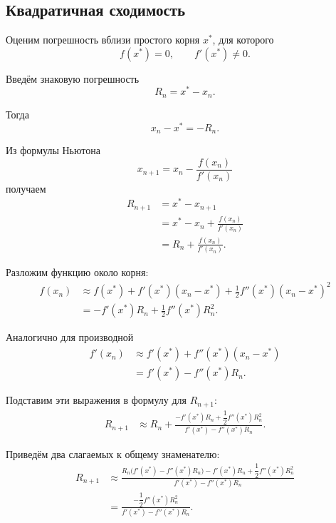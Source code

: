 \documentclass[../final.tex]{subfiles}
\begin{document}
\subsection{Квадратичная сходимость}

Оценим погрешность вблизи простого корня $x^*$, для которого
%
\begin{equation*}
    f(x^*)=0,
    \qquad
    f'(x^*)\neq0.
\end{equation*}

Введём знаковую погрешность
%
\begin{equation*}
    R_n=x^*-x_n.
\end{equation*}

Тогда
%
\begin{equation*}
    x_n-x^*=-R_n.
\end{equation*}

Из формулы Ньютона
%
\begin{equation*}
    x_{n+1}
    =
    x_n
    -
    \frac{f(x_n)}{f'(x_n)}
\end{equation*}
%
получаем
%
\begin{align*}
    R_{n+1}
    &=
    x^*-x_{n+1}
    \\
    &=
    x^*-x_n
    +
    \frac{f(x_n)}{f'(x_n)}
    \\
    &=
    R_n
    +
    \frac{f(x_n)}{f'(x_n)}.
\end{align*}

Разложим функцию около корня:
%
\begin{align*}
    f(x_n)
    &\approx
    f(x^*)
    +
    f'(x^*)(x_n-x^*)
    +
    \frac12 f''(x^*)(x_n-x^*)^2
    \\
    &=
    -f'(x^*)R_n
    +
    \frac12 f''(x^*)R_n^2.
\end{align*}

Аналогично для производной
%
\begin{align*}
    f'(x_n)
    &\approx
    f'(x^*)
    +
    f''(x^*)(x_n-x^*)
    \\
    &=
    f'(x^*)
    -
    f''(x^*)R_n.
\end{align*}

Подставим эти выражения в формулу для $R_{n+1}$:
%
\begin{align*}
    R_{n+1}
    &\approx
    R_n
    +
    \frac{
        -f'(x^*)R_n
        +
        \dfrac12 f''(x^*)R_n^2
    }{
        f'(x^*)
        -
        f''(x^*)R_n
    }.
\end{align*}

Приведём два слагаемых к общему знаменателю:
%
\begin{align*}
    R_{n+1}
    &\approx
    \frac{
        R_n\bigl(f'(x^*)-f''(x^*)R_n\bigr)
        -
        f'(x^*)R_n
        +
        \dfrac12 f''(x^*)R_n^2
    }{
        f'(x^*)-f''(x^*)R_n
    }
    \\
    &=
    \frac{
        -\dfrac12 f''(x^*)R_n^2
    }{
        f'(x^*)-f''(x^*)R_n
    }.
\end{align*}
\end{document}
